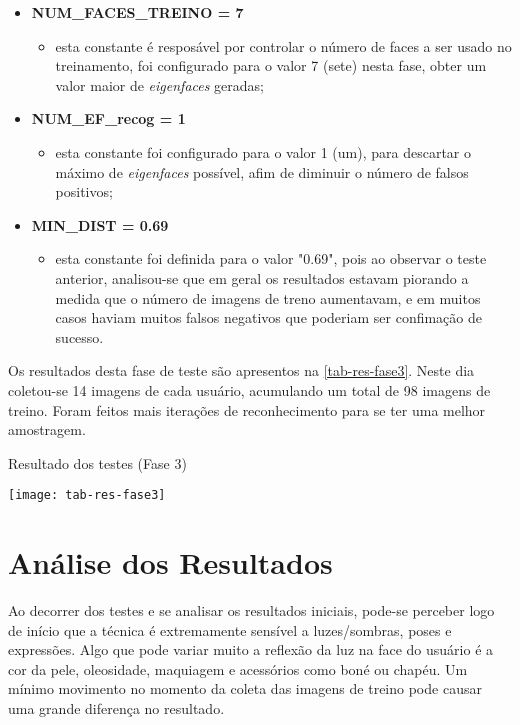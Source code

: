 \begin{itemize}	
	\item \textbf{NUM\_FACES\_TREINO = 7}
	\begin{itemize}	
		\item esta constante é resposável por controlar o número de faces a ser usado no treinamento, foi configurado para o valor 7 (sete) nesta fase, obter um valor maior de \textit{eigenfaces} geradas;
	\end{itemize}
	
	\item \textbf{NUM\_EF\_recog = 1}
	\begin{itemize}	
		\item esta constante foi configurado para o valor 1 (um), para descartar o máximo de \textit{eigenfaces} possível, afim de diminuir o número de falsos positivos;
	\end{itemize}
	
	\item \textbf{MIN\_DIST = 0.69}
	\begin{itemize}	
		\item esta constante foi definida para o valor "0.69", pois ao observar o teste anterior, analisou-se que em geral os resultados estavam piorando a medida que o número de imagens de treno aumentavam, e em muitos casos haviam muitos falsos negativos que poderiam ser confimação de sucesso.
	\end{itemize}
\end{itemize}

Os resultados desta fase de teste são apresentos na \autoref{tab-res-fase3}. Neste dia coletou-se 14 imagens de cada usuário, acumulando um total de 98 imagens de treino. Foram feitos mais iterações de reconhecimento para se ter uma melhor amostragem.

\begin{table}[h]
	\centering
	\caption{Resultado dos testes (Fase 3) }
	\texttt{[image: tab-res-fase3]}
	\label{tab-res-fase3}
\end{table}





\section{Análise dos Resultados}\label{ch:analresult}

Ao decorrer dos testes e se analisar os resultados iniciais, pode-se perceber logo de início que a técnica é extremamente sensível a luzes/sombras, poses e expressões. Algo que pode variar muito a reflexão da luz na face do usuário é a cor da pele, oleosidade, maquiagem e acessórios como boné ou chapéu. Um mínimo movimento no momento da coleta das imagens de treino pode causar uma grande diferença no resultado.

